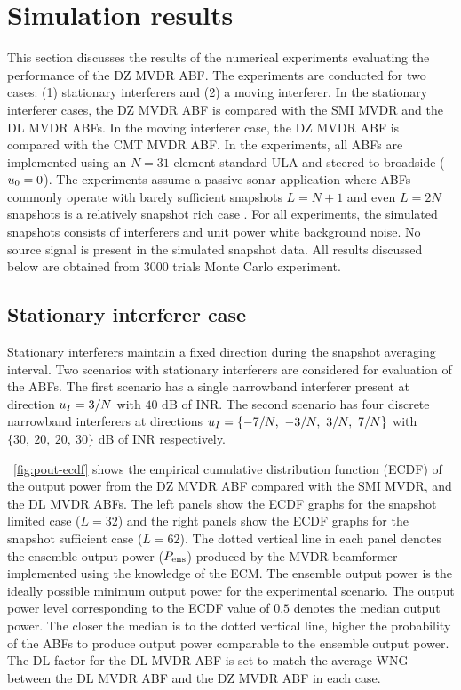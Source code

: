\section{Simulation results}
\label{sec:results}
This section discusses the results of the numerical experiments
evaluating the performance of the DZ MVDR ABF. The experiments are
conducted for two cases: (1) stationary interferers and (2) a moving
interferer. In the stationary interferer cases, the DZ MVDR ABF is
compared with the SMI MVDR and the DL MVDR ABFs. In the moving
interferer case, the DZ MVDR ABF is compared with the CMT MVDR ABF.
In the experiments, all ABFs are implemented using an $N = 31$ element
standard ULA and steered to broadside ($u_0 = 0$). The experiments
assume a passive sonar application where ABFs commonly operate with
barely sufficient snapshots $L = N + 1$ and even $L = 2N$ snapshots
is a relatively snapshot rich case
\cite{cox2002adaptive,baggeroer1999passive}. For all experiments, the
simulated snapshots consists of interferers and unit power white
background noise. No source signal is present in the simulated
snapshot data. All results discussed below are obtained from 3000
trials Monte Carlo experiment.

\subsection{Stationary interferer case}
\label{sec:stat-interf}
Stationary interferers maintain a fixed direction during the snapshot
averaging interval. Two scenarios with stationary interferers are
considered for evaluation of the ABFs. The first scenario has a single
narrowband interferer present at direction $u_I = 3/N$ with $40$
dB of INR. The second scenario has four discrete narrowband
interferers at directions $u_I = \{-7/N, ~-3/N, ~3/N, ~7/N \}$
with $\{30, ~20, ~20, ~30 \}$ dB of INR respectively.

\figurename{}~\ref{fig:pout-ecdf} shows the empirical cumulative
distribution function (ECDF) of the output power from the DZ MVDR ABF
compared with the SMI MVDR, and the DL MVDR ABFs. The left panels show
the ECDF graphs for the snapshot limited case ($L = 32$) and the right
panels show the ECDF graphs for the snapshot sufficient case
($L = 62$). The dotted vertical line in each panel denotes the
ensemble output power ($P_{\rm ens}$) produced by the MVDR beamformer
implemented using the knowledge of the ECM. The ensemble output power
is the ideally possible minimum output power for the experimental
scenario. The output power level corresponding to the ECDF value of
$0.5$ denotes the median output power. The closer the median is to the
dotted vertical line, higher the probability of the ABFs to produce
output power comparable to the ensemble output power. The DL factor
for the DL MVDR ABF is set to match the average WNG between the DL
MVDR ABF and the DZ MVDR ABF in each case.


